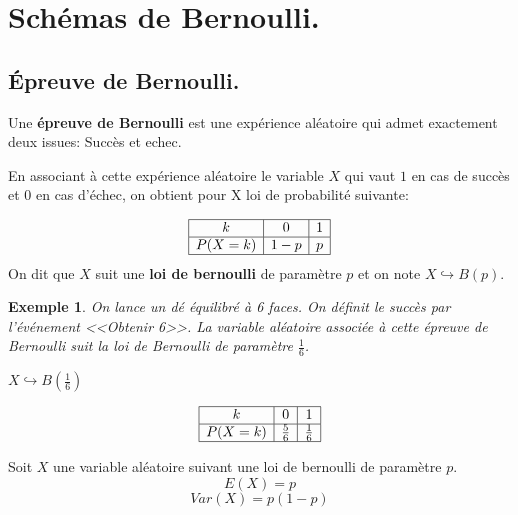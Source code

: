 \documentclass[a4paper,11pt]{article}
\theoremstyle{break}
\newcounter{enonce}
\newtheorem{exemple}[enonce]{Exemple}
\renewcommand\arraystretch{1.3}
\renewcommand\arraystretch{1.8}
\begin{document}
   \newpage
 
   
    \section{Schémas de Bernoulli.}
  \subsection{\'Epreuve de Bernoulli.}

  \begin{definition}
    Une \textbf{épreuve de Bernoulli} est une expérience aléatoire qui admet exactement deux issues:
    Succès et echec.
    
    En associant à cette expérience aléatoire le variable $X$ qui vaut $1$ en cas de succès et 
    $0$ en cas d'échec, on obtient pour X loi de probabilité suivante:
     
     \renewcommand{\arraystretch}{1.5}
 $$
\begin{array}{|c|c|c|}

\hline
    k&0&1\\
    \hline
    P(X=k)&1-p&p\\
    \hline
    \end{array} 
$$   
     On dit que $X$ suit une \textbf{loi de bernoulli} de paramètre $p$ et on note $X \hookrightarrow B(p)$.
  \end{definition}

  
 
   \begin{exemple}
    On lance un dé équilibré à 6 faces. On définit le succès par l'événement <<Obtenir 6>>.
    La variable aléatoire associée à cette épreuve de Bernoulli suit la loi de Bernoulli
    de paramètre $\frac{1}{6}$.
    
    $X \hookrightarrow B(\frac{1}{6})$
    
    \renewcommand{\arraystretch}{2.2}
     $$
\begin{array}{|c|c|c|}

\hline
    k&0&1\\
    \hline
    P(X=k)&\frac{5}{6}&\frac{1}{6}\\
    \hline
    \end{array} 
$$
  
 \end{exemple}

  \begin{proposition}
  Soit $X$ une variable aléatoire suivant une loi de bernoulli de paramètre $p$.
  $$E(X)=p$$ $$Var(X)=p(1-p)$$
  
 \end{proposition}
\end{document}
